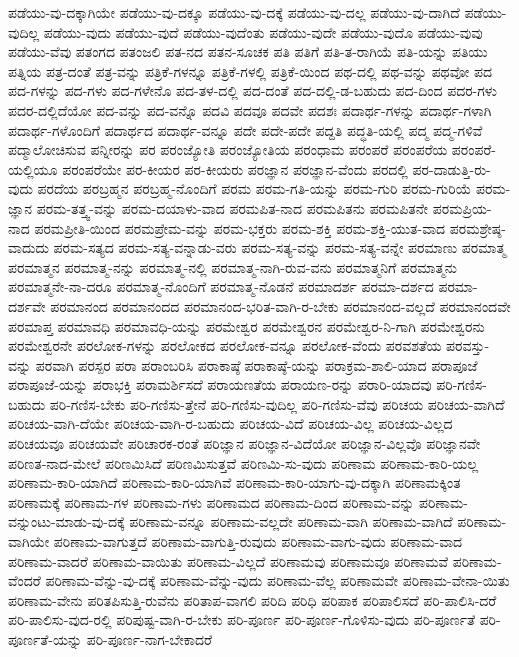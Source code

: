 {ಪಡೆಯು-ವು-ದಕ್ಕಾಗಿಯೇ
ಪಡೆಯು-ವು-ದಕ್ಕೂ
ಪಡೆಯು-ವು-ದಕ್ಕೆ
ಪಡೆಯು-ವು-ದಲ್ಲ
ಪಡೆಯು-ವು-ದಾಗಿದೆ
ಪಡೆಯು-ವುದಿಲ್ಲ
ಪಡೆಯು-ವುದು
ಪಡೆಯು-ವುದೆ
ಪಡೆಯು-ವುದೆಂತು
ಪಡೆಯು-ವುದೇ
ಪಡೆಯು-ವುದೊ
ಪಡೆಯು-ವುವು
ಪಡೆಯು-ವೆವು
ಪತಂಗದ
ಪತಂಜಲಿ
ಪತ-ನದ
ಪತನ-ಸೂಚಕ
ಪತಿ
ಪತಿಗೆ
ಪತಿ-ತ-ರಾಗಿಯೆ
ಪತಿ-ಯನ್ನು
ಪತಿಯು
ಪತ್ನಿಯ
ಪತ್ರ-ದಂತೆ
ಪತ್ರ-ವನ್ನು
ಪತ್ರಿಕೆ-ಗಳನ್ನೂ
ಪತ್ರಿಕೆ-ಗಳಲ್ಲಿ
ಪತ್ರಿಕೆ-ಯಿಂದ
ಪಥ-ದಲ್ಲಿ
ಪಥ-ವನ್ನು
ಪಥವೋ
ಪದ
ಪದ-ಗಳನ್ನು
ಪದ-ಗಳು
ಪದ-ಗಳೇನೊ
ಪದ-ತಳ-ದಲ್ಲಿ
ಪದ-ದಂತೆ
ಪದ-ದಲ್ಲಿ-ಡ-ಬಹುದು
ಪದ-ದಿಂದ
ಪದರ-ಗಳು
ಪದರ-ದಲ್ಲಿದೆಯೋ
ಪದ-ವನ್ನು
ಪದ-ವನ್ನೊ
ಪದವಿ
ಪದವೂ
ಪದವೇ
ಪದಶಃ
ಪದಾರ್ಥ-ಗಳನ್ನು
ಪದಾರ್ಥ-ಗಳಾಗಿ
ಪದಾರ್ಥ-ಗಳೊಂದಿಗೆ
ಪದಾರ್ಥದ
ಪದಾರ್ಥ-ವನ್ನೂ
ಪದೇ
ಪದೇ-ಪದೇ
ಪದ್ದತಿ
ಪದ್ಧತಿ-ಯಲ್ಲಿ
ಪದ್ಮ
ಪದ್ಮ-ಗಳಿವೆ
ಪದ್ಮಾಲೋಚಿಸುವ
ಪನ್ನೀರನ್ನು
ಪರ
ಪರಂಜ್ಯೋತಿ
ಪರಂಜ್ಯೋತಿಯ
ಪರಂಧಾಮ
ಪರಂಪರೆ
ಪರಂಪರೆಯ
ಪರಂಪರೆ-ಯಲ್ಲಿಯೂ
ಪರಂಪರೆಯೇ
ಪರ-ಕೀಯರ
ಪರ-ಕೀಯರು
ಪರಜ್ಞಾನ
ಪರಜ್ಞಾನ-ವೆಂದು
ಪರದಲ್ಲಿ
ಪರ-ದಾಡುತ್ತಿ-ರು-ವುದು
ಪರದೆಯ
ಪರಬ್ರಹ್ಮನ
ಪರಬ್ರಹ್ಮ-ನೊಂದಿಗೆ
ಪರಮ
ಪರಮ-ಗತಿ-ಯನ್ನು
ಪರಮ-ಗುರಿ
ಪರಮ-ಗುರಿಯೆ
ಪರಮ-ಜ್ಞಾನ
ಪರಮ-ತತ್ತ್ವ-ವನ್ನು
ಪರಮ-ದಯಾಳು-ವಾದ
ಪರಮಪಿತ-ನಾದ
ಪರಮಪಿತನು
ಪರಮಪಿತನೇ
ಪರಮಪ್ರಿಯ-ನಾದ
ಪರಮಪ್ರೀತಿ-ಯಿಂದ
ಪರಮಪ್ರೇಮ-ವನ್ನು
ಪರಮ-ಭಕ್ತರು
ಪರಮ-ಶಕ್ತಿ
ಪರಮ-ಶಕ್ತಿ-ಯುತ-ವಾದ
ಪರಮಶ್ರೇಷ್ಠ-ವಾದುದು
ಪರಮ-ಸತ್ಯದ
ಪರಮ-ಸತ್ಯ-ವನ್ನಾಡು-ವರು
ಪರಮ-ಸತ್ಯ-ವನ್ನು
ಪರಮ-ಸತ್ಯ-ವನ್ನೇ
ಪರಮಾಣು
ಪರಮಾತ್ಮ
ಪರಮಾತ್ಮನ
ಪರಮಾತ್ಮ-ನನ್ನು
ಪರಮಾತ್ಮ-ನಲ್ಲಿ
ಪರಮಾತ್ಮ-ನಾಗಿ-ರುವ-ವನು
ಪರಮಾತ್ಮನಿಗೆ
ಪರಮಾತ್ಮನು
ಪರಮಾತ್ಮನೇ-ನಾ-ದರೂ
ಪರಮಾತ್ಮ-ನೊಂದಿಗೆ
ಪರಮಾತ್ಮ-ನೊಡನೆ
ಪರಮಾದರ್ಶ
ಪರಮಾ-ದರ್ಶದ
ಪರಮಾ-ದರ್ಶವೇ
ಪರಮಾನಂದ
ಪರಮಾನಂದದ
ಪರಮಾನಂದ-ಭರಿತ-ವಾಗಿ-ರ-ಬೇಕು
ಪರಮಾನಂದ-ವಲ್ಲದೆ
ಪರಮಾನಂದವೇ
ಪರಮಾಪ್ತ
ಪರಮಾವಧಿ
ಪರಮಾವಧಿ-ಯನ್ನು
ಪರಮೇಶ್ವರ
ಪರಮೇಶ್ವರನ
ಪರಮೇಶ್ವರ-ನಿ-ಗಾಗಿ
ಪರಮೇಶ್ವರನು
ಪರಮೇಶ್ವರನೇ
ಪರಲೋಕ-ಗಳನ್ನು
ಪರಲೋಕದ
ಪರಲೋಕ-ವನ್ನೂ
ಪರಲೋಕ-ವೆಂದು
ಪರವಶತೆಯ
ಪರವಸ್ತು-ವನ್ನು
ಪರವಾಗಿ
ಪರಸ್ಪರ
ಪರಾ
ಪರಾಂಬರಿಸಿ
ಪರಾಕಾಷ್ಠೆ
ಪರಾಕಾಷ್ಠೆ-ಯನ್ನು
ಪರಾಕ್ರಮ-ಶಾಲಿ-ಯಾದ
ಪರಾಪೂಜೆ
ಪರಾಪೂಜೆ-ಯನ್ನು
ಪರಾಭಕ್ತಿ
ಪರಾಮರ್ಶಿಸದೆ
ಪರಾಯಣತೆಯ
ಪರಾಯಣ-ರನ್ನು
ಪರಾರಿ-ಯಾದವು
ಪರಿ-ಗಣಿಸ-ಬಹುದು
ಪರಿ-ಗಣಿಸ-ಬೇಕು
ಪರಿ-ಗಣಿಸು-ತ್ತೇನೆ
ಪರಿ-ಗಣಿಸು-ವುದಿಲ್ಲ
ಪರಿ-ಗಣಿಸು-ವೆವು
ಪರಿಚಯ
ಪರಿಚಯ-ವಾಗಿದೆ
ಪರಿಚಯ-ವಾಗಿ-ದೆಯೇ
ಪರಿಚಯ-ವಾಗಿ-ರ-ಬಹುದು
ಪರಿಚಯ-ವಿದೆ
ಪರಿಚಯ-ವಿಲ್ಲ
ಪರಿಚಯ-ವಿಲ್ಲದ
ಪರಿಚಯವೂ
ಪರಿಚಯವೇ
ಪರಿಚಾರಕ-ರಂತೆ
ಪರಿಜ್ಞಾನ
ಪರಿಜ್ಞಾನ-ವಿದೆಯೋ
ಪರಿಜ್ಞಾನ-ವಿಲ್ಲವೊ
ಪರಿಜ್ಞಾನವೇ
ಪರಿಣತ-ನಾದ-ಮೇಲೆ
ಪರಿಣಮಿಸಿದೆ
ಪರಿಣಮಿಸುತ್ತವೆ
ಪರಿಣಮಿ-ಸು-ವುದು
ಪರಿಣಾಮ
ಪರಿಣಾಮ-ಕಾರಿ-ಯಲ್ಲ
ಪರಿಣಾಮ-ಕಾರಿ-ಯಾಗಿದೆ
ಪರಿಣಾಮ-ಕಾರಿ-ಯಾಗಿವೆ
ಪರಿಣಾಮ-ಕಾರಿ-ಯಾಗು-ವು-ದಕ್ಕಾಗಿ
ಪರಿಣಾಮಕ್ಕಿಂತ
ಪರಿಣಾಮಕ್ಕೆ
ಪರಿಣಾಮ-ಗಳ
ಪರಿಣಾಮ-ಗಳು
ಪರಿಣಾಮದ
ಪರಿಣಾಮ-ದಿಂದ
ಪರಿಣಾಮ-ವನ್ನು
ಪರಿಣಾಮ-ವನ್ನುಂಟು-ಮಾಡು-ವು-ದಕ್ಕೆ
ಪರಿಣಾಮ-ವನ್ನೂ
ಪರಿಣಾಮ-ವಲ್ಲದೇ
ಪರಿಣಾಮ-ವಾಗಿ
ಪರಿಣಾಮ-ವಾಗಿದೆ
ಪರಿಣಾಮ-ವಾಗಿಯೇ
ಪರಿಣಾಮ-ವಾಗುತ್ತದೆ
ಪರಿಣಾಮ-ವಾಗುತ್ತಿ-ರುವುದು
ಪರಿಣಾಮ-ವಾಗು-ವುದು
ಪರಿಣಾಮ-ವಾದ
ಪರಿಣಾಮ-ವಾದರೆ
ಪರಿಣಾಮ-ವಾಯಿತು
ಪರಿಣಾಮ-ವಿಲ್ಲದೆ
ಪರಿಣಾಮವು
ಪರಿಣಾಮವೂ
ಪರಿಣಾಮವೆ
ಪರಿಣಾಮ-ವೆಂದರೆ
ಪರಿಣಾಮ-ವೆನ್ನು-ವು-ದಕ್ಕೆ
ಪರಿಣಾಮ-ವೆನ್ನು-ವುದು
ಪರಿಣಾಮ-ವೆಲ್ಲ
ಪರಿಣಾಮವೇ
ಪರಿಣಾಮ-ವೇನಾ-ಯಿತು
ಪರಿಣಾಮ-ವೇನು
ಪರಿತಪಿಸುತ್ತಿ-ರುವೆನು
ಪರಿತಾಪ-ವಾಗಲಿ
ಪರಿದಿ
ಪರಿಧಿ
ಪರಿಪಾಕ
ಪರಿಪಾಲಿಸದೆ
ಪರಿ-ಪಾಲಿಸಿ-ದರೆ
ಪರಿ-ಪಾಲಿಸು-ವುದ-ರಲ್ಲಿ
ಪರಿಪುಷ್ಟ-ವಾಗಿ-ರ-ಬೇಕು
ಪರಿ-ಪೂರ್ಣ
ಪರಿ-ಪೂರ್ಣ-ಗೊಳಿಸು-ವುದು
ಪರಿ-ಪೂರ್ಣತೆ
ಪರಿ-ಪೂರ್ಣತೆ-ಯನ್ನು
ಪರಿ-ಪೂರ್ಣ-ನಾಗ-ಬೇಕಾದರೆ
}
